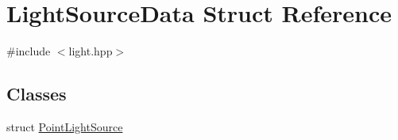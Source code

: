 \hypertarget{struct_light_source_data}{}\section{Light\+Source\+Data Struct Reference}
\label{struct_light_source_data}


{\ttfamily \#include $<$light.\+hpp$>$}

\subsection*{Classes}
\begin{DoxyCompactItemize}
\item 
struct \hyperlink{struct_light_source_data_1_1_point_light_source}{Point\+Light\+Source}
\end{DoxyCompactItemize}
